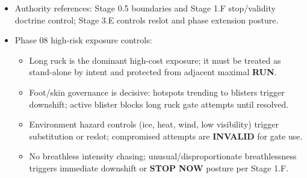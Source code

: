 \documentclass[10pt]{article}
\begin{document}
\begin{itemize}
\item Authority references: Stage 0.5 boundaries and Stage 1.F stop/validity doctrine control; Stage 3.E controls reslot and phase extension posture.
\item Phase 08 high-risk exposure controls:
  \begin{itemize}
  \item Long ruck is the dominant high-cost exposure; it must be treated as stand-alone by intent and protected from adjacent maximal \textbf{RUN}.
  \item Foot/skin governance is decisive: hotspots trending to blisters trigger downshift; active blister blocks long ruck gate attempts until resolved.
  \item Environment hazard controls (ice, heat, wind, low visibility) trigger substitution or reslot; compromised attempts are \textbf{INVALID} for gate use.
  \item No breathless intensity chasing; unusual/disproportionate breathlessness triggers immediate downshift or \textbf{STOP} \textbf{NOW} posture per Stage 1.F.
  \end{itemize}
\end{itemize}
\end{document}
